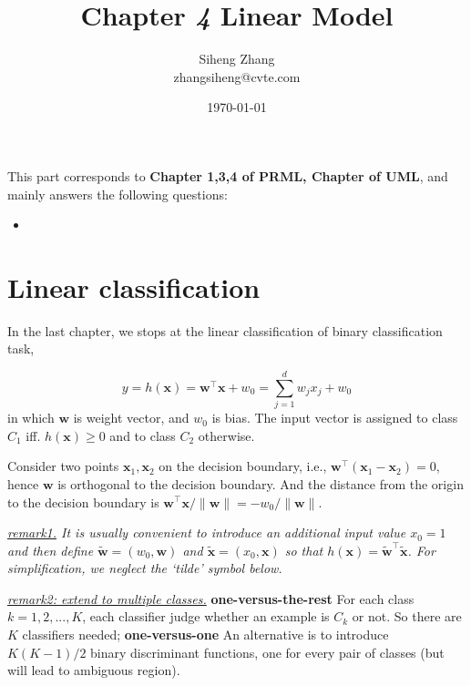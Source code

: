 \documentclass{article}
\author{Siheng Zhang\\zhangsiheng@cvte.com}
\title{Chapter \textbf{\textit{4}} Linear Model}
\date{\today}
\begin{document}
\maketitle  

This part corresponds to \textbf{Chapter 1,3,4 of PRML, Chapter of UML}, and mainly answers the following questions:

\begin{itemize}
\item 
\end{itemize}

\tableofcontents
\newpage

\section{Linear classification}

	In the last chapter, we stops at the linear classification of binary classification task,
	
	\begin{equation}
	y=h(\mathbf{x})=\mathbf{w}^\top \mathbf{x} + w_0 = \sum_{j=1}^d w_j x_j + w_0
	\label{eq:linear}
	\end{equation}
in which $\mathbf{w}$ is weight vector, and $w_0$ is bias. The input vector is assigned to class $C_1$ iff. $h(\mathbf{x})\geq 0$ and to class $C_2$ otherwise.

	Consider two points $\mathbf{x}_1,\mathbf{x}_2$ on the decision boundary, i.e., $\mathbf{w}^\top (\mathbf{x}_1 - \mathbf{x}_2) = 0$, hence $\mathbf{w}$ is orthogonal to the decision boundary. And the distance from the origin to the decision boundary is $\mathbf{w}^\top \mathbf{x} / \|\mathbf{w}\|=-w_0/\|\mathbf{w}\|$.
	
	\vspace{2mm}
	\begin{scriptsize}
	\begin{spacing}{1.2}
	{\sffamily
	\noindent\textit{\underline{remark1.} It is usually convenient to  introduce an additional input value $x_0 = 1$ and then define $\tilde{\mathbf{w}} = (w_0, \mathbf{w})$ and $\tilde{\mathbf{x}} = (x_0, \mathbf{x})$ so that $h(\mathbf{x}) = \tilde{\mathbf{w}}^\top \tilde{\mathbf{x}}$. For simplification, we neglect the `tilde' symbol below.}
	
	\noindent\textit{\underline{remark2: extend to multiple classes.}}  \textbf{one-versus-the-rest} For each class $k=1,2,...,K$, each classifier judge whether an example is $C_k$ or not. So there are $K$ classifiers needed;  \textbf{one-versus-one} An alternative is to introduce $K(K-1)/2$ binary discriminant functions, one for every pair of classes (but will lead to ambiguous region).}
	\end{spacing}
	\end{scriptsize}
	\vspace{-2mm}
	
\end{document}
